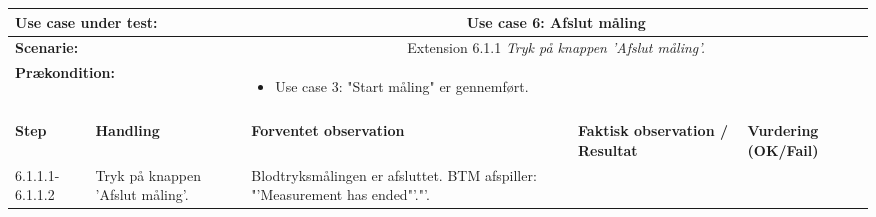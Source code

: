 \begin{tabular}{|p{1cm}|p{3cm}|p{4cm}|p{4cm}|p{2cm}|}
\hline
\multicolumn{2}{|p{3cm}|}{\textbf{Use case under test:}} & \multicolumn{3}{c|}{Use case 6: Afslut måling} \\\hline

\multicolumn{2}{|p{3cm}|}{\textbf{Scenarie:}} & \multicolumn{3}{c|}{Extension 6.1.1 \textit{Tryk på knappen 'Afslut måling'.}} \\\hline

\multicolumn{2}{|p{3cm}|}{\textbf{Prækondition:}}  & \multicolumn{3}{l|}{\parbox{0.6\textwidth}{
\begin{itemize}[label=$\circ$]
\item Use case 3: "Start måling" er gennemført.
\end{itemize} }}\\\hline

\multicolumn{5}{|c|}{} \\\hline

\textbf{Step} & \textbf{Handling} & \textbf{Forventet observation} & \textbf{Faktisk observation / Resultat} & \textbf{Vurdering (OK/Fail)}\\\hline

6.1.1.1-6.1.1.2 & Tryk på knappen 'Afslut måling'. & Blodtryksmålingen er afsluttet. BTM afspiller: "'Measurement has ended"'."'. & & \\\hline

\end{tabular}

